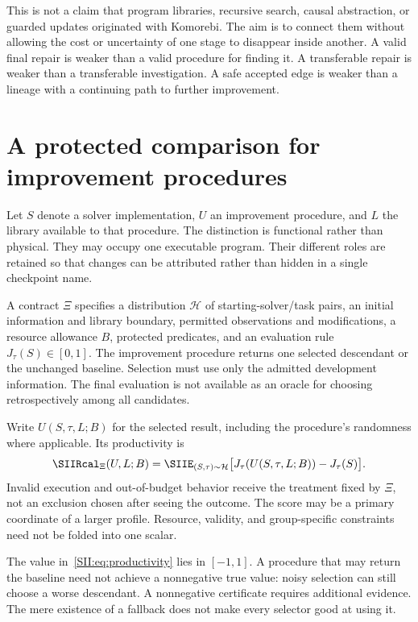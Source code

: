 This is not a claim that program libraries, recursive search, causal abstraction, or guarded updates originated with Komorebi. The aim is to connect them without allowing the cost or uncertainty of one stage to disappear inside another. A valid final repair is weaker than a valid procedure for finding it. A transferable repair is weaker than a transferable investigation. A safe accepted edge is weaker than a lineage with a continuing path to further improvement.

\section{A protected comparison for improvement procedures}\label{SII:sec:contract}
Let $S$ denote a solver implementation, $U$ an improvement procedure, and $L$ the library available to that procedure. The distinction is functional rather than physical. They may occupy one executable program. Their different roles are retained so that changes can be attributed rather than hidden in a single checkpoint name.

\begin{SIIdefinition}\label{SII:def:contract}
A contract $\Xi$ specifies a distribution $\mathcal H$ of starting-solver/task pairs, an initial information and library boundary, permitted observations and modifications, a resource allowance $B$, protected predicates, and an evaluation rule $J_\tau(S)\in[0,1]$. The improvement procedure returns one selected descendant or the unchanged baseline. Selection must use only the admitted development information. The final evaluation is not available as an oracle for choosing retrospectively among all candidates.
\end{SIIdefinition}

Write $U(S,\tau,L;B)$ for the selected result, including the procedure's randomness where applicable. Its productivity is
\begin{equation}\label{SII:eq:productivity}
\SIIRcal_\Xi(U,L;B)=\SIIE_{(S,\tau)\sim\mathcal H}
\big[J_\tau(U(S,\tau,L;B))-J_\tau(S)\big].
\end{equation}
Invalid execution and out-of-budget behavior receive the treatment fixed by $\Xi$, not an exclusion chosen after seeing the outcome. The score may be a primary coordinate of a larger profile. Resource, validity, and group-specific constraints need not be folded into one scalar.

The value in~\eqref{SII:eq:productivity} lies in $[-1,1]$. A procedure that may return the baseline need not achieve a nonnegative true value: noisy selection can still choose a worse descendant. A nonnegative certificate requires additional evidence. The mere existence of a fallback does not make every selector good at using it.

